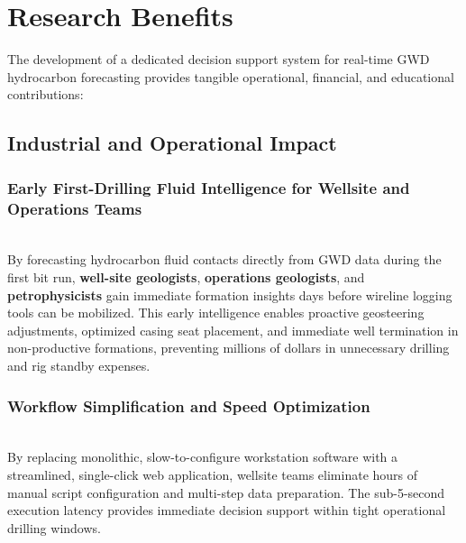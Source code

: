 \section{Research Benefits}

The development of a dedicated decision support system for real-time GWD hydrocarbon forecasting provides tangible operational, financial, and educational contributions:

\subsection{Industrial and Operational Impact}

\subsubsection{Early First-Drilling Fluid Intelligence for Wellsite and Operations Teams}~\\
By forecasting hydrocarbon fluid contacts directly from GWD data during the first bit run, \textbf{well-site geologists}, \textbf{operations geologists}, and \textbf{petrophysicists} gain immediate formation insights days before wireline logging tools can be mobilized. This early intelligence enables proactive geosteering adjustments, optimized casing seat placement, and immediate well termination in non-productive formations, preventing millions of dollars in unnecessary drilling and rig standby expenses.

\subsubsection{Workflow Simplification and Speed Optimization}~\\
By replacing monolithic, slow-to-configure workstation software with a streamlined, single-click web application, wellsite teams eliminate hours of manual script configuration and multi-step data preparation. The sub-5-second execution latency provides immediate decision support within tight operational drilling windows.


